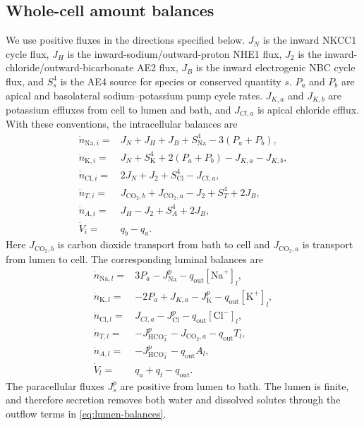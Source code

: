 \documentclass[11pt]{article}
\newcommand{\Na}{\mathrm{Na}^{+}}
\newcommand{\K}{\mathrm{K}^{+}}
\newcommand{\Cl}{\mathrm{Cl}^{-}}
\newcommand{\HCO}{\mathrm{HCO}_{3}^{-}}
\begin{document}
\subsection{Whole-cell amount balances}

We use positive fluxes in the directions specified below. $J_N$ is the inward NKCC1 cycle flux, $J_H$ is the inward-sodium/outward-proton NHE1 flux, $J_2$ is the inward-chloride/outward-bicarbonate AE2 flux, $J_B$ is the inward electrogenic NBC cycle flux, and $S^4_s$ is the AE4 source for species or conserved quantity $s$. $P_a$ and $P_b$ are apical and basolateral sodium--potassium pump cycle rates. $J_{K,a}$ and $J_{K,b}$ are potassium effluxes from cell to lumen and bath, and $J_{Cl,a}$ is apical chloride efflux. With these conventions, the intracellular balances are
\begin{equation}
\begin{aligned}
\dot n_{\mathrm{Na},i}={}&J_N+J_H+J_B+S^4_{\mathrm{Na}}-3(P_a+P_b),\\
\dot n_{\mathrm{K},i}={}&J_N+S^4_{\mathrm K}+2(P_a+P_b)-J_{K,a}-J_{K,b},\\
\dot n_{\mathrm{Cl},i}={}&2J_N+J_2+S^4_{\mathrm{Cl}}-J_{Cl,a},\\
\dot n_{T,i}={}&J_{\mathrm{CO}_2,b}+J_{\mathrm{CO}_2,a}-J_2+S^4_T+2J_B,\\
\dot n_{A,i}={}&J_H-J_2+S^4_A+2J_B,\\
\dot V_i={}&q_b-q_a.
\end{aligned}
\label{eq:cell-balances}
\end{equation}
Here $J_{\mathrm{CO}_2,b}$ is carbon dioxide transport from bath to cell and $J_{\mathrm{CO}_2,a}$ is transport from lumen to cell. The corresponding luminal balances are
\begin{equation}
\begin{aligned}
\dot n_{\mathrm{Na},l}={}&3P_a-J^p_{\mathrm{Na}}-q_{\mathrm{out}}[\Na]_l,\\
\dot n_{\mathrm{K},l}={}&-2P_a+J_{K,a}-J^p_{\mathrm K}-q_{\mathrm{out}}[\K]_l,\\
\dot n_{\mathrm{Cl},l}={}&J_{Cl,a}-J^p_{\mathrm{Cl}}-q_{\mathrm{out}}[\Cl]_l,\\
\dot n_{T,l}={}&-J^p_{\HCO}-J_{\mathrm{CO}_2,a}-q_{\mathrm{out}}T_l,\\
\dot n_{A,l}={}&-J^p_{\HCO}-q_{\mathrm{out}}A_l,\\
\dot V_l={}&q_a+q_t-q_{\mathrm{out}}.
\end{aligned}
\label{eq:lumen-balances}
\end{equation}
The paracellular fluxes $J^p_s$ are positive from lumen to bath. The lumen is finite, and therefore secretion removes both water and dissolved solutes through the outflow terms in \cref{eq:lumen-balances}.
\end{document}
